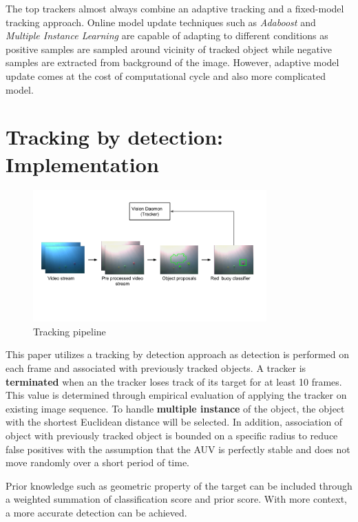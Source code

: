 \documentclass[hyp]{socreport}
\begin{document}
The top trackers almost always combine an adaptive tracking and a fixed-model
tracking approach. Online model update techniques such as \textit{Adaboost} and
\textit{Multiple Instance Learning} are capable of adapting to different
conditions as positive samples are sampled around vicinity of tracked object
while negative samples are extracted from background of the image. However,
adaptive model update comes at the cost of computational cycle and also more
complicated model. 

\section{Tracking by detection: Implementation}

\begin{figure}[H]
\centering
  \includegraphics[width=0.8\textwidth, height=0.3\textheight]{tracker.png}
  \caption{Tracking pipeline}
  \label{fig:tracker}
\end{figure}

This paper utilizes a tracking by detection approach as detection is performed
on each frame and associated with previously tracked objects. A tracker is
\textbf{terminated} when an the tracker loses track of its target for at least
10 frames. This value is determined through empirical evaluation of applying the
tracker on existing image sequence. To handle \textbf{multiple instance} of the
object, the object with the shortest Euclidean distance will be selected. In
addition, association of object with previously tracked object is bounded on a
specific radius to reduce false positives with the assumption that the AUV is
perfectly stable and does not move randomly over a short period of time.

Prior knowledge such as geometric property of the target can be included through
a weighted summation of classification score and prior score. With more context,
a more accurate detection can be achieved.
\end{document}
